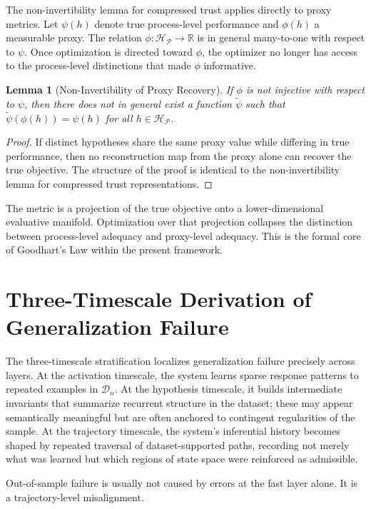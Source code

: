 \documentclass[12pt]{article}
\theoremstyle{plain}
\newtheorem{lemma}[theorem]{Lemma}
\theoremstyle{definition}
\theoremstyle{remark}
\begin{document}
The non-invertibility lemma for compressed trust applies directly to proxy metrics. Let $\psi(h)$ denote true process-level performance and $\phi(h)$ a measurable proxy. The relation $\phi : \mathcal{H}_{\mathcal{P}} \to \mathbb{R}$ is in general many-to-one with respect to $\psi$. Once optimization is directed toward $\phi$, the optimizer no longer has access to the process-level distinctions that made $\phi$ informative.

\begin{lemma}[Non-Invertibility of Proxy Recovery]
If $\phi$ is not injective with respect to $\psi$, then there does not in general exist a function $\tilde{\psi}$ such that $\tilde{\psi}(\phi(h)) = \psi(h)$ for all $h \in \mathcal{H}_{\mathcal{P}}$.
\end{lemma}

\begin{proof}
If distinct hypotheses share the same proxy value while differing in true performance, then no reconstruction map from the proxy alone can recover the true objective. The structure of the proof is identical to the non-invertibility lemma for compressed trust representations.
\end{proof}

The metric is a projection of the true objective onto a lower-dimensional evaluative manifold. Optimization over that projection collapses the distinction between process-level adequacy and proxy-level adequacy. This is the formal core of Goodhart's Law within the present framework.

\section{Three-Timescale Derivation of Generalization Failure}

The three-timescale stratification localizes generalization failure precisely across layers. At the activation timescale, the system learns sparse response patterns to repeated examples in $\mathcal{D}_n$. At the hypothesis timescale, it builds intermediate invariants that summarize recurrent structure in the dataset; these may appear semantically meaningful but are often anchored to contingent regularities of the sample. At the trajectory timescale, the system's inferential history becomes shaped by repeated traversal of dataset-supported paths, recording not merely what was learned but which regions of state space were reinforced as admissible.

Out-of-sample failure is usually not caused by errors at the fast layer alone. It is a trajectory-level misalignment.
\end{document}
